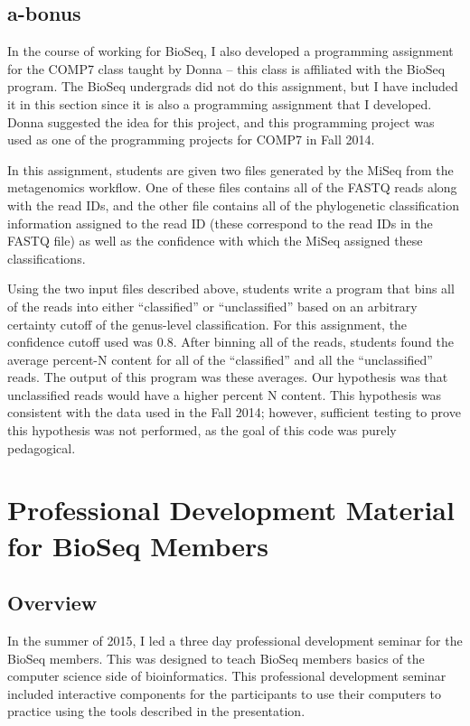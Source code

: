 \documentclass{report}
\begin{document}
\subsection{a-bonus}
In the course of working for BioSeq, I also developed a programming assignment for the COMP7 class taught by Donna -- this class is affiliated with the BioSeq program. The BioSeq undergrads did not do this assignment, but I have included it in this section since it is also a programming assignment that I developed. Donna suggested the idea for this project, and this programming project was used as one of the programming projects for COMP7 in Fall 2014.

In this assignment, students are given two files generated by the MiSeq from the metagenomics workflow. One of these files contains all of the FASTQ reads along with the read IDs, and the other file contains all of the phylogenetic classification information assigned to the read ID (these correspond to the read IDs in the FASTQ file) as well as the confidence with which the MiSeq assigned these classifications.

Using the two input files described above, students write a program that bins all of the reads into either ``classified'' or ``unclassified'' based on an arbitrary certainty cutoff of the genus-level classification. For this assignment, the confidence cutoff used was 0.8. After binning all of the reads, students found the average percent-N content for all of the ``classified'' and all the ``unclassified'' reads. The output of this program was these averages. Our hypothesis was that unclassified reads would have a higher percent N content. This hypothesis was consistent with the data used in the Fall 2014; however, sufficient testing to prove this hypothesis was not performed, as the goal of this code was purely pedagogical. 

\section{Professional Development Material for BioSeq Members}
\subsection{Overview}
In the summer of 2015, I led a three day professional development seminar for the BioSeq members. This was designed to teach BioSeq members basics of the computer science side of bioinformatics. This professional development seminar included interactive components for the participants to use their computers to practice using the tools described in the presentation.
\end{document}

